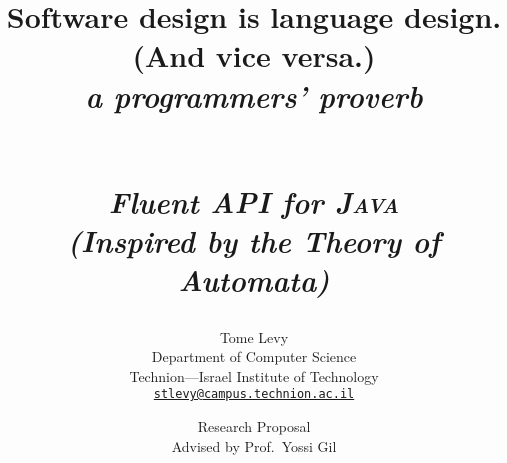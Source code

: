 \title
{%
\begin{flushright}
  \scriptsize\bfseries
  Software design is language design. \\
    (And vice versa.) \\
  \footnotesize\mdseries\itshape
   a programmers' proverb
\end{flushright}
  \Huge \Self \\ 
  \huge \itshape \textbf Fluent \textbf API for \textsc{\textbf Java} \\
  \LARGE (\textbf Inspired by the \textbf Theory of \textbf Automata)
} 
\documentclass[10pt,twocolumn]{article}

\usepackage{\jobname}

\author{Tome Levy\\
  Department of Computer Science\\
  Technion---Israel Institute of Technology\\
  \texttt{\small \href{mailto:stlevy@campus.technion.ac.il}{stlevy@campus.technion.ac.il}}}
\date{%
  Research Proposal\\
  \small Advised by Prof.\ Yossi Gil
}



\maketitle

\begin{abstract}
	 
\end{abstract}

\section{Introduction}


\paragraph{Outline.} 
The remainder of this document is organized as follows.
, intended mostly to the general, non software engineering, 
  computer science audience is a brief reminder of pertinent terminology.
This terminology is then used in \cref{Section:proposal} for 
  an introductory exposition of \Self.
The main ideas behind the bootstrapping definition of \Self 
  are revealed in . 
 concludes. 

\section{Terminology}
\label{Section:terminology}


